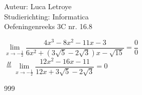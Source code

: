 \documentclass[a4paper]{article}
\begin{document}
  
\noindent \large Auteur: Luca Letroye        \\
\noindent \large Studierichting: Informatica \\
\noindent \large Oefeningenreeks 3C nr. 16.8 \\

\medskip

\normalsize

$ \lim\limits_{x \rightarrow -\tfrac{1}{2}} \dfrac{4x^3-8x^2-11x-3}{6x^2+(3\sqrt{5} - 2\sqrt{3})x - \sqrt{15}} = \dfrac{0}{0}$\\

$ \overset{H}{=}  \lim\limits_{x \rightarrow -\tfrac{1}{2}} \dfrac{12x^2-16x-11}{12x + 3\sqrt{5} - 2\sqrt{3}} = 0$\\





\begin{thebibliography}{999}
\end{thebibliography}
\end{document}
